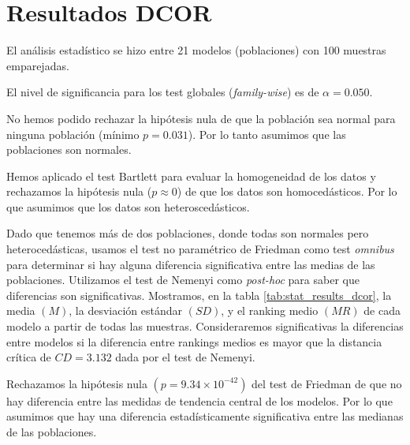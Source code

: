 \documentclass[a4paper,oneside,11pt,leqno]{article}
\begin{document}
	\section{Resultados DCOR}
	\label{sec:results_dcor}

	El análisis estadístico se hizo entre 21 modelos (poblaciones) con 100 muestras emparejadas.

	El nivel de significancia para los test globales (\textit{family-wise}) es de $\alpha=0.050$.

	No hemos podido rechazar la hipótesis nula de que la población sea normal para ninguna población (mínimo $p=0.031$). Por lo tanto asumimos que las poblaciones son normales.

	Hemos aplicado el test Bartlett para evaluar la homogeneidad de los datos y rechazamos la hipótesis nula ($p\approx 0$) de que los datos son homocedásticos. Por lo que asumimos que los datos son heteroscedásticos.

	Dado que tenemos más de dos poblaciones, donde todas son normales pero heterocedásticas, usamos el test no paramétrico de Friedman como test \textit{omnibus} para determinar si hay alguna diferencia significativa entre las medias de las poblaciones. Utilizamos el test de Nemenyi como \textit{post-hoc} para saber que diferencias son significativas. Mostramos, en la tabla \ref{tab:stat_results_dcor}, la media $(M)$, la desviación estándar $(SD)$, y el ranking medio $(MR)$ de cada modelo a partir de todas las muestras. Consideraremos significativas la diferencias entre modelos si la diferencia entre rankings medios es mayor que la distancia crítica de $CD=3.132$ dada por el test de Nemenyi.

	Rechazamos la hipótesis nula $(p=9.34\times 10^{-42})$ del test de Friedman de que no hay diferencia entre las medidas de tendencia central de los modelos. Por lo que asumimos que hay una diferencia estadísticamente significativa entre las medianas de las poblaciones.
\end{document}
